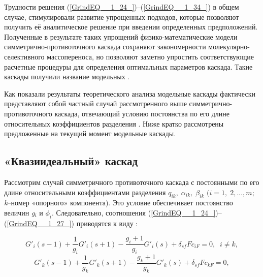 Трудности решения (\ref{GrindEQ__1_24_})--(\ref{GrindEQ__1_34_}) в общем случае, стимулировали развитие упрощенных подходов, которые позволяют получить её аналитическое решение при введении определенных предположений. Полученные в результате таких упрощений физико-математические модели симметрично-противоточного каскада сохраняют закономерности молекулярно-селективного массопереноса, но позволяют заметно упростить соответствующие расчетные процедуры для определения оптимальных параметров каскада. Такие каскады получили название модельных \cite{minenkoTeoriiKaskadovDlya1965, delagarzaMulticomponentIsotopeSeparation1961, zhigalovskiyLekcionnyeMaterialyPo1999, kolokoltsovDesignCascadesSeparating1970, kolokolcovVoprosuPostroeniiKaskadov1970, minenkoPredelnoeObogashcheniePromezhutochnyh1972, yamamotoMulticomponentIsotopeSeparating1978, wuStudyMulticomponentIsotope, borisevichRascheteKaskadovDopolnitelnym1993, woodCriterionEffiencyMultiisotope1999, sulaberidzeOsobennostiObogashcheniyaKomponentov2006, sazykinKvaziidealnyeKaskadyDlya2000, sulaberidzeSravnenieOptimalnyhModelnyh2008}.

Как показали результаты теоретического анализа модельные каскады фактически представляют собой частный случай рассмотренного выше симметрично-противоточного каскада, отвечающий условию постоянства по его длине относительных коэффициентов разделения \cite{sulaberidzeClassificationModelCascades2020}.  
Ниже кратко рассмотрены предложенные на текущий момент модельные каскады.

\subsection{«Квазиидеальный» каскад}

Рассмотрим случай симметричного противоточного каскада с постоянными по его длине относительными коэффициентами разделения $q_{ik} ,\; \alpha _{ik} ,\; \beta _{ik} $ $(i=1,\; 2,...,m;$ \textit{k}--номер «опорного» компонента). Это условие обеспечивает постоянство величин \textit{g${}_{i}$} и $\phi _{i} $. Следовательно, соотношения (\ref{GrindEQ__1_24_})--(\ref{GrindEQ__1_27_}) приводятся к виду \cite{sulaberidzeTeoriyaKaskadovDlya2011}:

\begin{equation} \label{GrindEQ__1_52_} 
  G'_{i} (s-1)+\frac{1}{g_{i} } G'_{i} (s+1)-\frac{g_{i} +1}{g_{i} } G'_{i} (s)+\delta _{sf} Fc_{iF} =0,\; \; i\ne k, 
  \end{equation} 
  \begin{equation} \label{GrindEQ__1_53_} 
  G'_{k} (s-1)+\frac{1}{g_{k} } G'_{k} (s+1)-\frac{g_{k} +1}{g_{k} } G'_{k} (s)+\delta _{sf} Fc_{kF} =0, 
  \end{equation}

